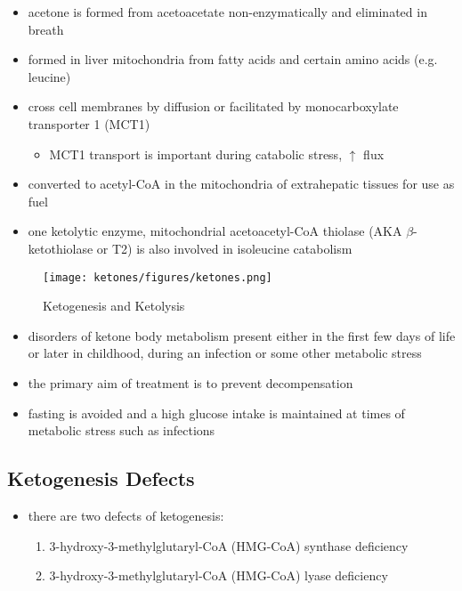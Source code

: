 \documentclass[12pt]{scrartcl}
\begin{document}
\begin{itemize}
\item acetone is formed from acetoacetate non-enzymatically and eliminated in breath
\item formed in liver mitochondria from fatty acids and certain amino acids (e.g. leucine)
\item cross cell membranes by diffusion or facilitated by monocarboxylate transporter 1 (MCT1)
\begin{itemize}
\item MCT1 transport is important during catabolic stress, \(\uparrow\) flux
\end{itemize}
\item converted to acetyl-CoA in the mitochondria of extrahepatic tissues for use as fuel
\item one ketolytic enzyme, mitochondrial acetoacetyl-CoA thiolase (AKA
\(\beta\)-ketothiolase or T2) is also involved in isoleucine catabolism
\end{itemize}

\begin{figure}[htbp]
\centering
\texttt{[image: ketones/figures/ketones.png]}
\caption{\label{fig:orge7d2e06}Ketogenesis and Ketolysis}
\end{figure}

\begin{itemize}
\item disorders of ketone body metabolism present either in the first few
days of life or later in childhood, during an infection or some
other metabolic stress
\item the primary aim of treatment is to prevent decompensation
\item fasting is avoided and a high glucose intake is maintained at times
of metabolic stress such as infections
\end{itemize}

\subsection{Ketogenesis Defects}
\label{sec:orga2a98b7}
\begin{itemize}
\item there are two defects of ketogenesis:
\begin{enumerate}
\item 3-hydroxy-3-methylglutaryl-CoA (HMG-CoA) synthase deficiency
\item 3-hydroxy-3-methylglutaryl-CoA (HMG-CoA) lyase deficiency
\end{enumerate}
\end{itemize}
\end{document}
